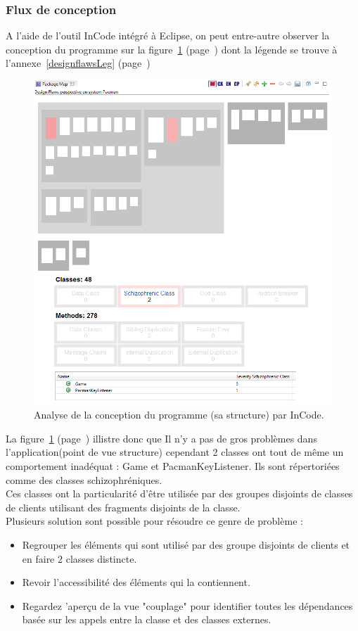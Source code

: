 \documentclass[12pt,a4paper,final]{article}
\newcommand{\annexe}[1]{annexe~\ref{#1} (page~\pageref{#1})}
\newcommand{\labelfigure}[1]{figure~\ref{#1} (page~\pageref{#1})}
\begin{document}
\subsubsection{Flux de conception}
A l'aide de l'outil InCode intégré à Eclipse, on peut entre-autre observer la conception du programme sur la \labelfigure{designflaws} dont la légende se trouve à l'\annexe{designflawsLeg}
\begin{figure}[!h]
	\centering
	\includegraphics[width=\textwidth]{InCodeDesignFlaws.png}
	\caption{\label{designflaws}Analyse de la conception du programme (sa structure) par InCode.}
\end{figure}
La \labelfigure{designflaws} illistre donc que Il n'y a pas de gros problèmes dans l'application(point de vue structure) cependant 2 classes ont tout de même un comportement inadéquat : Game et PacmanKeyListener. Ils sont répertoriées comme des classes schizophréniques.\\
Ces classes ont la particularité  d'être utilisée par des groupes disjoints de classes de clients utilisant des fragments disjoints de la classe.\\
Plusieurs solution sont possible pour résoudre ce genre de problème :
\begin{itemize}
\item Regrouper les éléments qui sont utilisé par des groupe disjoints de clients et en faire 2 classes distincte.
\item Revoir l'accessibilité des éléments qui la contiennent.
\item Regardez 'aperçu de la vue "couplage" pour identifier toutes les dépendances basée sur les appels entre la classe et des classes externes.
\end{itemize}
\end{document}
